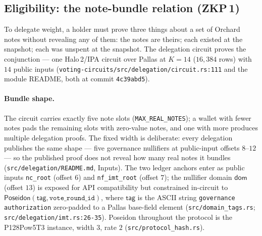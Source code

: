 \documentclass[11pt,a4paper]{article}
\theoremstyle{definition}
\begin{document}
\subsection{Eligibility: the note-bundle relation (ZKP\,1)}
\label{sec:vote-zkp1}

To delegate weight, a holder must prove three things about a set of Orchard
notes without revealing any of them: the notes are theirs; each existed at
the snapshot; each was unspent at the snapshot. The delegation circuit
proves the conjunction --- one Halo\,2/IPA circuit over Pallas at $K=14$
($16{,}384$ rows) with $14$ public inputs
(\texttt{voting-circuits/src/delegation/circuit.rs:111} and the module
README, both at commit \texttt{4c39abd5}).

\paragraph{Bundle shape.} The circuit carries exactly five note slots
(\texttt{MAX\_REAL\_NOTES}); a wallet with fewer notes pads the remaining
slots with zero-value notes, and one with more produces multiple delegation
proofs. The fixed width is deliberate: every delegation publishes the same
shape --- five governance nullifiers at public-input offsets $8$--$12$ ---
so the published proof does not reveal how many real notes it bundles
(\texttt{src/delegation/README.md}, Inputs). The two ledger anchors enter as
public inputs \texttt{nc\_root} (offset $6$) and \texttt{nf\_imt\_root}
(offset $7$); the nullifier domain $\mathsf{dom}$ (offset $13$) is exposed
for API compatibility but constrained in-circuit to
$\mathsf{Poseidon}(\mathsf{tag}, \texttt{vote\_round\_id})$, where
$\mathsf{tag}$ is the ASCII string \texttt{governance authorization}
zero-padded to a Pallas base-field element
(\texttt{src/domain\_tags.rs}; \texttt{src/delegation/imt.rs:26-35}).
Poseidon throughout the protocol is the P128Pow5T3 instance, width $3$,
rate $2$ (\texttt{src/protocol\_hash.rs}).
\end{document}

